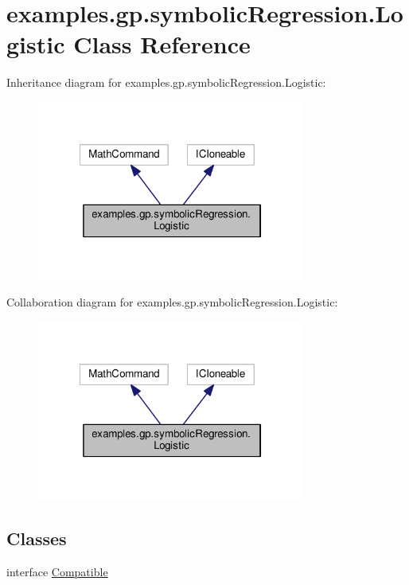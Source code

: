 \hypertarget{classexamples_1_1gp_1_1symbolic_regression_1_1_logistic}{\section{examples.\-gp.\-symbolic\-Regression.\-Logistic Class Reference}
\label{classexamples_1_1gp_1_1symbolic_regression_1_1_logistic}
}


Inheritance diagram for examples.\-gp.\-symbolic\-Regression.\-Logistic\-:
\nopagebreak
\begin{figure}[H]
\begin{center}
\leavevmode
\includegraphics[width=249pt]{classexamples_1_1gp_1_1symbolic_regression_1_1_logistic__inherit__graph}
\end{center}
\end{figure}


Collaboration diagram for examples.\-gp.\-symbolic\-Regression.\-Logistic\-:
\nopagebreak
\begin{figure}[H]
\begin{center}
\leavevmode
\includegraphics[width=249pt]{classexamples_1_1gp_1_1symbolic_regression_1_1_logistic__coll__graph}
\end{center}
\end{figure}
\subsection*{Classes}
\begin{DoxyCompactItemize}
\item 
interface \hyperlink{interfaceexamples_1_1gp_1_1symbolic_regression_1_1_logistic_1_1_compatible}{Compatible}
\end{DoxyCompactItemize}
